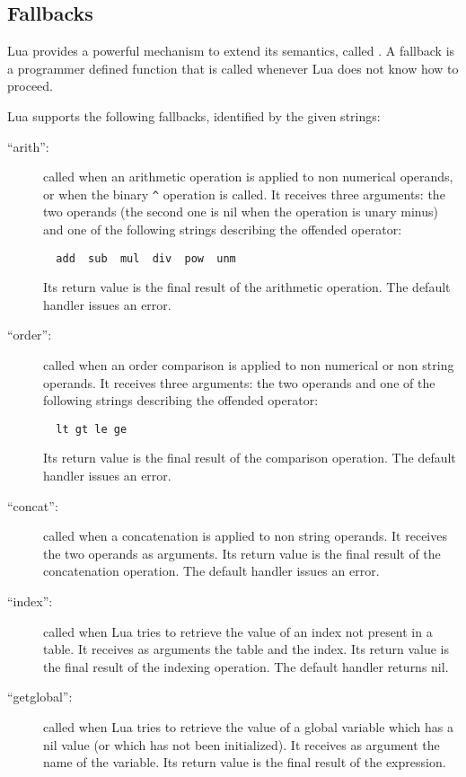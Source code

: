 \subsection{Fallbacks} \label{fallback}

Lua provides a powerful mechanism to extend its semantics,
called .
A fallback is a programmer defined function
that is called whenever Lua does not know how to proceed.

Lua supports the following fallbacks,
identified by the given strings:
\begin{description}
\item[``arith'':]
called when an arithmetic operation is applied to non numerical operands,
or when the binary \verb'^' operation is called.
It receives three arguments:
the two operands (the second one is nil when the operation is unary minus)
and one of the following strings describing the offended operator:
\begin{verbatim}
  add  sub  mul  div  pow  unm
\end{verbatim}
Its return value is the final result of the arithmetic operation.
The default handler issues an error.
\item[``order'':]
called when an order comparison is applied to non numerical or
non string operands.
It receives three arguments:
the two operands and
one of the following strings describing the offended operator:
\begin{verbatim}
  lt gt le ge
\end{verbatim}
Its return value is the final result of the comparison operation.
The default handler issues an error.
\item[``concat'':]
called when a concatenation is applied to non string operands.
It receives the two operands as arguments.
Its return value is the final result of the concatenation operation.
The default handler issues an error.
\item[``index'':]
called when Lua tries to retrieve the value of an index
not present in a table.
It receives as arguments the table and the index.
Its return value is the final result of the indexing operation.
The default handler returns nil.
\item[``getglobal'':]
called when Lua tries to retrieve the value of a global variable
which has a nil value (or which has not been initialized).
It receives as argument the name of the variable.
Its return value is the final result of the expression.

\end{description}
